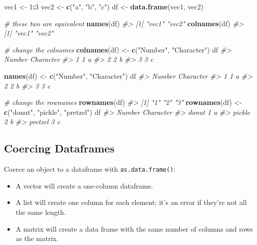\documentclass[]{book}
\newenvironment{Shaded}{\begin{snugshade}}{\end{snugshade}}
\newcommand{\CommentTok}[1]{\textcolor[rgb]{0.56,0.35,0.01}{\textit{#1}}}
\newcommand{\DecValTok}[1]{\textcolor[rgb]{0.00,0.00,0.81}{#1}}
\newcommand{\KeywordTok}[1]{\textcolor[rgb]{0.13,0.29,0.53}{\textbf{#1}}}
\newcommand{\NormalTok}[1]{#1}
\newcommand{\OperatorTok}[1]{\textcolor[rgb]{0.81,0.36,0.00}{\textbf{#1}}}
\newcommand{\StringTok}[1]{\textcolor[rgb]{0.31,0.60,0.02}{#1}}
\begin{document}
\begin{Shaded}
\begin{Highlighting}[]
\NormalTok{vec1 <-}\StringTok{ }\DecValTok{1}\OperatorTok{:}\DecValTok{3}
\NormalTok{vec2 <-}\StringTok{ }\KeywordTok{c}\NormalTok{(}\StringTok{"a"}\NormalTok{, }\StringTok{"b"}\NormalTok{, }\StringTok{"c"}\NormalTok{)}
\NormalTok{df <-}\StringTok{ }\KeywordTok{data.frame}\NormalTok{(vec1, vec2)}

\CommentTok{# these two are equivalent}
\KeywordTok{names}\NormalTok{(df)}
\CommentTok{#> [1] "vec1" "vec2"}
\KeywordTok{colnames}\NormalTok{(df)}
\CommentTok{#> [1] "vec1" "vec2"}

\CommentTok{# change the colnames}
\KeywordTok{colnames}\NormalTok{(df) <-}\StringTok{ }\KeywordTok{c}\NormalTok{(}\StringTok{"Number"}\NormalTok{, }\StringTok{"Character"}\NormalTok{)}
\NormalTok{df}
\CommentTok{#>   Number Character}
\CommentTok{#> 1      1         a}
\CommentTok{#> 2      2         b}
\CommentTok{#> 3      3         c}

\KeywordTok{names}\NormalTok{(df) <-}\StringTok{ }\KeywordTok{c}\NormalTok{(}\StringTok{"Number"}\NormalTok{, }\StringTok{"Character"}\NormalTok{)}
\NormalTok{df}
\CommentTok{#>   Number Character}
\CommentTok{#> 1      1         a}
\CommentTok{#> 2      2         b}
\CommentTok{#> 3      3         c}

\CommentTok{# change the rownames}
\KeywordTok{rownames}\NormalTok{(df) }
\CommentTok{#> [1] "1" "2" "3"}
\KeywordTok{rownames}\NormalTok{(df) <-}\StringTok{ }\KeywordTok{c}\NormalTok{(}\StringTok{"donut"}\NormalTok{, }\StringTok{"pickle"}\NormalTok{, }\StringTok{"pretzel"}\NormalTok{)}
\NormalTok{df}
\CommentTok{#>         Number Character}
\CommentTok{#> donut        1         a}
\CommentTok{#> pickle       2         b}
\CommentTok{#> pretzel      3         c}
\end{Highlighting}
\end{Shaded}

\hypertarget{coercing-dataframes}{%
\subsection{Coercing Dataframes}\label{coercing-dataframes}}

Coerce an object to a dataframe with \texttt{as.data.frame()}:

\begin{itemize}
\item
  A vector will create a one-column dataframe.
\item
  A list will create one column for each element; it's an error if they're
  not all the same length.
\item
  A matrix will create a data frame with the same number of columns and rows as the matrix.
\end{itemize}
\end{document}
